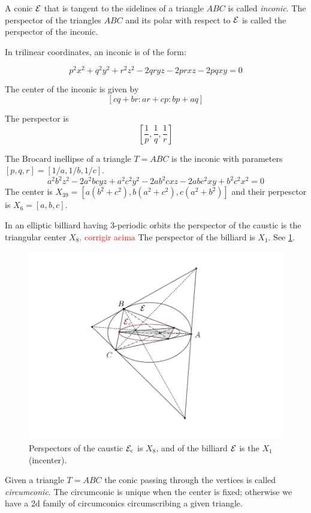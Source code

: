 A conic $\mathcal{E}$ that is tangent to the sidelines of a triangle $ABC$ is called {\em inconic}. The perspector of the triangles $ABC$ and its polar with respect to $\mathcal{E}$ is called the perspector of the inconic.

In trilinear coordinates, an inconic is of the form:

\[p^2 x^2+q^2 y^2 +r^2 z^2 - 2 q r y z -2 p r x z- 2 p q  x y=0\]
 
 The center of the inconic is given by 
 \[ [c q + b r : a r + c p : b p + a q] \]
 
 The perspector is 
 \[ [\frac{1}{p},\frac{1}{q},\frac{1}{r}] \]


 \begin{remark}
 The Brocard inellipse of a triangle $T=ABC$ is the inconic with parameters $[p,q,r]=[ 1/a,1/b,1/c]$.
 \[ a^2 b^2 z^2 - 2 a^2 b c y z + a^2 c^2 y^2 - 2 a b^2 c x z - 2 a b c^2 x y + b^2 c^2 x^2=0\]
 The center is $X_{39}=[a(b^2 + c^2), b(a^2  +  c^2), c( a^2  + b^2)]$ 
  and their perpesctor is $X_6=[a,b,c]$.
 \end{remark}
 
In   an elliptic  billiard having  3-periodic orbits the perspector of the caustic is the triangular center $X_8$. 
\textcolor{red}{corrigir acima}
The perspector of the billiard is $X_1$. See \cref{fig:appA-X8-X1-perspectors}.
\begin{figure}
    \centering
    \includegraphics[trim=80 20 100 15, clip,width=.6\textwidth]{zappA/pics/pics-appA-170-inconic-billiardggb.pdf}
    \caption{Perspectors of the caustic $\mathcal{E}_c$ is $X_8$, and of the billiard $\mathcal{E}$ is the $X_1$ (incenter). }
    \label{fig:appA-X8-X1-perspectors}
\end{figure}

Given a triangle $T=ABC$ the conic passing through the vertices is called {\em circumconic}. The circumconic is unique when the center is fixed; otherwise we have a 2d family of circumconics circumscribing a given triangle. 

